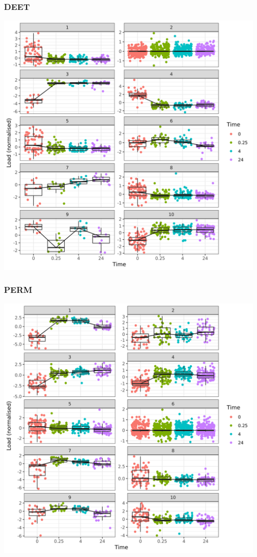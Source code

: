 \documentclass[11pt]{article}
\begin{document}
\subsubsection{DEET}
\label{sec:org81930ab}
\begin{center}
\includegraphics[width=.9\linewidth]{figure9/DEET/Legbox.png}
\end{center}
\subsubsection{PERM}
\label{sec:orgb02379f}
\begin{center}
\includegraphics[width=.9\linewidth]{figure9/PERM/Legbox.png}
\end{center}
\end{document}
